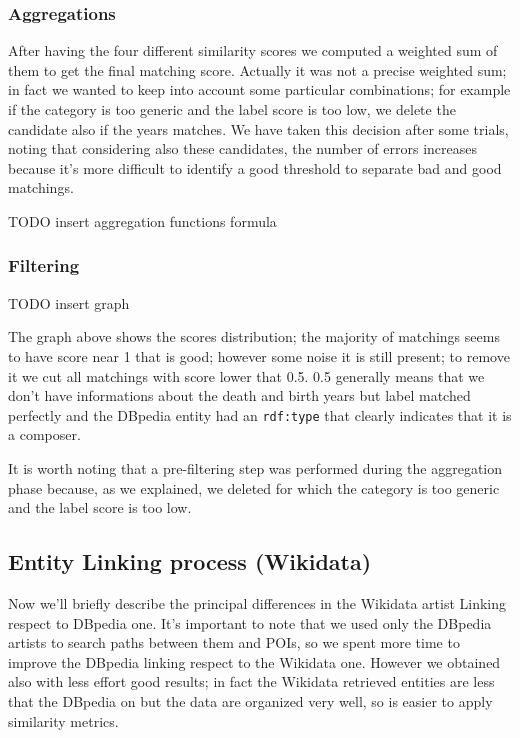 \documentclass[paper=a4, fontsize=11pt]{scrartcl}
\begin{document}
\subsubsection{Aggregations}

After having the four different similarity scores we computed a weighted sum of them  to get the final matching score. Actually it was not a precise weighted sum; in fact we wanted to keep into account some particular combinations; for example if the category is too generic and the label score is too low, we delete the candidate also if the years matches. We have taken this decision after some trials, noting that considering also these candidates, the number of errors increases because it's more difficult to identify a good threshold to separate bad and good matchings.

TODO insert aggregation functions formula

\subsubsection{Filtering}

TODO insert graph

The graph above shows the scores distribution; the majority of matchings seems to have score near 1 that is good; however some noise it is still present; to remove it we cut all matchings with score lower that 0.5. 0.5 generally means that we don't have informations about the death and birth years but label matched perfectly and the DBpedia entity had an \verb|rdf:type| that clearly indicates that it is a composer.

It is worth noting that a pre-filtering step was performed during the aggregation phase because, as we explained, we deleted for which the category is too generic and the label score is too low.

\subsection{Entity Linking process (Wikidata)}

Now we'll briefly describe the principal differences in the Wikidata artist Linking respect to DBpedia one. It's important to note that we used only the DBpedia artists to search paths between them and POIs, so we spent more time to improve the DBpedia linking respect to the Wikidata one. However we obtained also with less effort good results; in fact the Wikidata retrieved entities are less that the DBpedia on but the data are organized very well, so is easier to apply similarity metrics.
\end{document}
